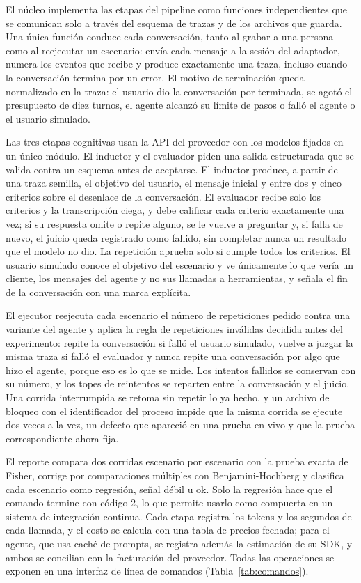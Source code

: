 El núcleo implementa las etapas del pipeline como funciones independientes que se comunican solo a través del esquema de trazas y de los archivos que guarda. Una única función conduce cada conversación, tanto al grabar a una persona como al reejecutar un escenario: envía cada mensaje a la sesión del adaptador, numera los eventos que recibe y produce exactamente una traza, incluso cuando la conversación termina por un error. El motivo de terminación queda normalizado en la traza: el usuario dio la conversación por terminada, se agotó el presupuesto de diez turnos, el agente alcanzó su límite de pasos o falló el agente o el usuario simulado.
\par
Las tres etapas cognitivas usan la API del proveedor con los modelos fijados en un único módulo. El inductor y el evaluador piden una salida estructurada que se valida contra un esquema antes de aceptarse. El inductor produce, a partir de una traza semilla, el objetivo del usuario, el mensaje inicial y entre dos y cinco criterios sobre el desenlace de la conversación. El evaluador recibe solo los criterios y la transcripción ciega, y debe calificar cada criterio exactamente una vez; si su respuesta omite o repite alguno, se le vuelve a preguntar y, si falla de nuevo, el juicio queda registrado como fallido, sin completar nunca un resultado que el modelo no dio. La repetición aprueba solo si cumple todos los criterios. El usuario simulado conoce el objetivo del escenario y ve únicamente lo que vería un cliente, los mensajes del agente y no sus llamadas a herramientas, y señala el fin de la conversación con una marca explícita.
\par
El ejecutor reejecuta cada escenario el número de repeticiones pedido contra una variante del agente y aplica la regla de repeticiones inválidas decidida antes del experimento: repite la conversación si falló el usuario simulado, vuelve a juzgar la misma traza si falló el evaluador y nunca repite una conversación por algo que hizo el agente, porque eso es lo que se mide. Los intentos fallidos se conservan con su número, y los topes de reintentos se reparten entre la conversación y el juicio. Una corrida interrumpida se retoma sin repetir lo ya hecho, y un archivo de bloqueo con el identificador del proceso impide que la misma corrida se ejecute dos veces a la vez, un defecto que apareció en una prueba en vivo y que la prueba correspondiente ahora fija.
\par
El reporte compara dos corridas escenario por escenario con la prueba exacta de Fisher, corrige por comparaciones múltiples con Benjamini-Hochberg y clasifica cada escenario como regresión, señal débil u ok. Solo la regresión hace que el comando termine con código 2, lo que permite usarlo como compuerta en un sistema de integración continua. Cada etapa registra los tokens y los segundos de cada llamada, y el costo se calcula con una tabla de precios fechada; para el agente, que usa caché de prompts, se registra además la estimación de su SDK, y ambos se concilian con la facturación del proveedor. Todas las operaciones se exponen en una interfaz de línea de comandos (Tabla~\ref{tab:comandos}).
\par

